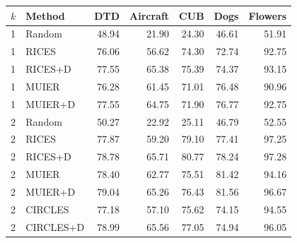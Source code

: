 \begin{tabular}{llrrrrr}
\toprule
$k$ & Method & DTD & Aircraft & CUB & Dogs & Flowers \\
\midrule
1 & Random & 48.94 & 21.90 & 24.30 & 46.61 & 51.91 \\
1 & RICES & 76.06 & 56.62 & 74.30 & 72.74 & 92.75 \\
1 & RICES+D & 77.55 & 65.38 & 75.39 & 74.37 & 93.15 \\
1 & MUIER & 76.28 & 61.45 & 71.01 & 76.48 & 90.96 \\
1 & MUIER+D & 77.55 & 64.75 & 71.90 & 76.77 & 92.75 \\
2 & Random & 50.27 & 22.92 & 25.11 & 46.79 & 52.55 \\
2 & RICES & 77.87 & 59.20 & 79.10 & 77.41 & 97.25 \\
2 & RICES+D & 78.78 & 65.71 & 80.77 & 78.24 & 97.28 \\
2 & MUIER & 78.40 & 62.77 & 75.51 & 81.42 & 94.16 \\
2 & MUIER+D & 79.04 & 65.26 & 76.43 & 81.56 & 96.67 \\
2 & CIRCLES & 77.18 & 57.10 & 75.62 & 74.15 & 94.55 \\
2 & CIRCLES+D & 78.99 & 65.56 & 77.05 & 74.94 & 96.05 \\
\bottomrule
\end{tabular}

